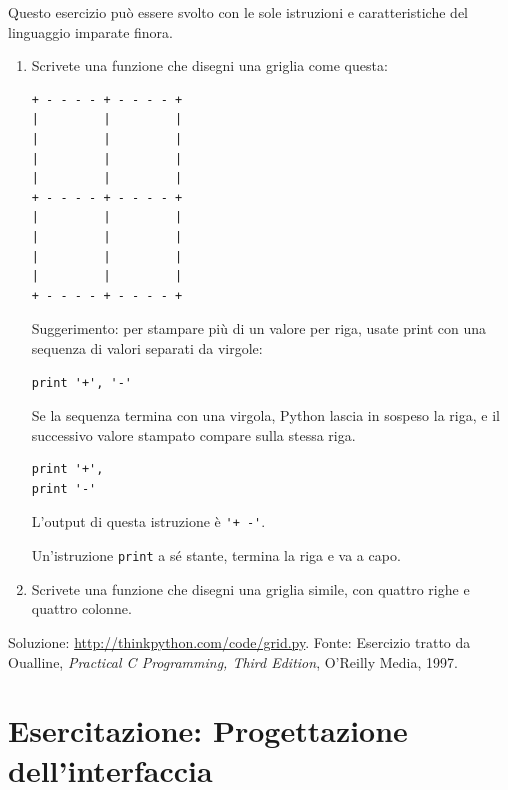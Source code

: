 \documentclass[10pt]{book}
\begin{document}
\vspace{0.2in}
\begin{exercise}

Questo esercizio può essere svolto con le sole istruzioni e caratteristiche del linguaggio imparate finora.

\begin{enumerate}

\item Scrivete una funzione che disegni una griglia come questa:

\begin{verbatim}
+ - - - - + - - - - +
|         |         |
|         |         |
|         |         |
|         |         |
+ - - - - + - - - - +
|         |         |
|         |         |
|         |         |
|         |         |
+ - - - - + - - - - +
\end{verbatim}
%
Suggerimento: per stampare più di un valore per riga, usate print con una sequenza di valori separati da virgole:

\begin{verbatim}
print '+', '-'
\end{verbatim}
%
Se la sequenza termina con una virgola, Python lascia in sospeso la riga, e il successivo valore stampato compare sulla stessa riga.

\begin{verbatim}
print '+', 
print '-'
\end{verbatim}
%
L'output di questa istruzione è \verb"'+ -'".

Un'istruzione {\tt print} a sé stante, termina la riga e va a capo.

\item Scrivete una funzione che disegni una griglia simile, con quattro righe e quattro colonne.

\end{enumerate}

Soluzione: \url{http://thinkpython.com/code/grid.py}.
Fonte: Esercizio tratto da Oualline, {\em Practical C Programming, Third Edition}, O'Reilly Media, 1997.

\end{exercise}





\chapter{Esercitazione: Progettazione dell'interfaccia}
\label{turtlechap}
\end{document}

